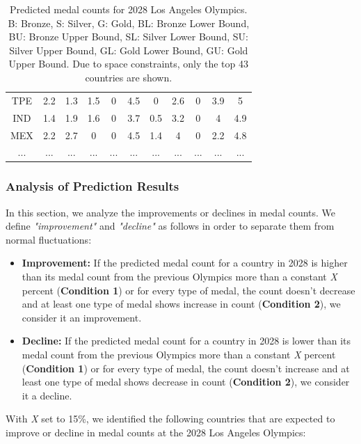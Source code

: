 \documentclass{mcmthesis}
\begin{document}
\begin{table}[htbp]
\begin{tabular}{|c|c|c|c|c|c|c|c|c|c|c|}
        TPE & 2.2 & 1.3 & 1.5 & 0 & 4.5 & 0 & 2.6 & 0 & 3.9 & 5 \\
        IND & 1.4 & 1.9 & 1.6 & 0 & 3.7 & 0.5 & 3.2 & 0 & 4 & 4.9 \\
        MEX & 2.2 & 2.7 & 0 & 0 & 4.5 & 1.4 & 4 & 0 & 2.2 & 4.8 \\
        ... & ... & ... & ... & ... & ... & ... & ... & ... & ... & ... \\
    \end{tabular}
    \caption{Predicted medal counts for 2028 Los Angeles Olympics. B: Bronze, S: Silver, G: Gold, BL: Bronze Lower Bound, BU: Bronze Upper Bound, SL: Silver Lower Bound, SU: Silver Upper Bound, GL: Gold Lower Bound, GU: Gold Upper Bound. Due to space constraints, only the top 43 countries are shown.}
    \label{tab:medal_counts}
\end{table}

\subsubsection{Analysis of Prediction Results}

In this section, we analyze the improvements or declines in medal counts. We define \textit{"improvement"} and \textit{"decline"} as follows in order to separate them from normal fluctuations:

\begin{itemize}
    \item \textbf{Improvement:} If the predicted medal count for a country in 2028 is higher than its medal count from the previous Olympics more than a constant \textit{X} percent (\textbf{Condition 1}) or for every type of medal, the count doesn't decrease and at least one type of medal shows increase in count (\textbf{Condition 2}), we consider it an improvement.
    \item \textbf{Decline:} If the predicted medal count for a country in 2028 is lower than its medal count from the previous Olympics more than a constant \textit{X} percent (\textbf{Condition 1}) or for every type of medal, the count doesn't increase and at least one type of medal shows decrease in count (\textbf{Condition 2}), we consider it a decline.
\end{itemize}

With \textit{X} set to 15\%, we identified the following countries that are expected to improve or decline in medal counts at the 2028 Los Angeles Olympics:
\end{document}

